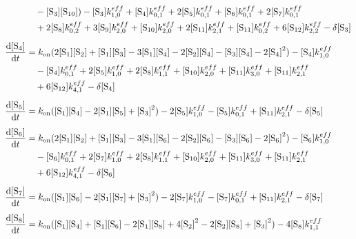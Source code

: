 \begin{align*}
 & \quad -\Conc{\species{3}}\Conc{\species{10}})-\Conc{\species{3}}k^{eff}_{1,0}+\Conc{\species{4}}k^{eff}_{0,1}+2\Conc{\species{5}}k^{eff}_{0,1}+\Conc{\species{6}}k^{eff}_{0,1}+2\Conc{\species{7}}k^{eff}_{0,1}\\
 & \quad +2\Conc{\species{8}}k^{eff}_{0,2}+3\Conc{\species{9}}k^{eff}_{2,0}+\Conc{\species{10}}k^{eff}_{2,0}+2\Conc{\species{11}}k^{eff}_{2,1}+\Conc{\species{11}}k^{eff}_{0,2}+6\Conc{\species{12}}k^{eff}_{2,2}-\delta\Conc{\species{3}}\\[0.5em]
\DCDtNoSpacing{\species{4}} &= \kon{}(2\Conc{\species{1}}\Conc{\species{2}}+\Conc{\species{1}}\Conc{\species{3}}-3\Conc{\species{1}}\Conc{\species{4}}-2\Conc{\species{2}}\Conc{\species{4}}-\Conc{\species{3}}\Conc{\species{4}}-2\Conc{\species{4}}^2)-\Conc{\species{4}}k^{eff}_{1,0}\\
 & \quad -\Conc{\species{4}}k^{eff}_{0,1}+2\Conc{\species{5}}k^{eff}_{1,0}+2\Conc{\species{8}}k^{eff}_{1,1}+\Conc{\species{10}}k^{eff}_{2,0}+\Conc{\species{11}}k^{eff}_{3,0}+\Conc{\species{11}}k^{eff}_{2,1}\\
 & \quad +6\Conc{\species{12}}k^{eff}_{4,1}-\delta\Conc{\species{4}}\\[0.5em]
\DCDtNoSpacing{\species{5}} &= \kon{}(\Conc{\species{1}}\Conc{\species{4}}-2\Conc{\species{1}}\Conc{\species{5}}+\Conc{\species{3}}^2)-2\Conc{\species{5}}k^{eff}_{1,0}-\Conc{\species{5}}k^{eff}_{0,1}+\Conc{\species{11}}k^{eff}_{2,1}-\delta\Conc{\species{5}}\\[0.5em]
\DCDtNoSpacing{\species{6}} &= \kon{}(2\Conc{\species{1}}\Conc{\species{2}}+\Conc{\species{1}}\Conc{\species{3}}-3\Conc{\species{1}}\Conc{\species{6}}-2\Conc{\species{2}}\Conc{\species{6}}-\Conc{\species{3}}\Conc{\species{6}}-2\Conc{\species{6}}^2)-\Conc{\species{6}}k^{eff}_{1,0}\\
 & \quad -\Conc{\species{6}}k^{eff}_{0,1}+2\Conc{\species{7}}k^{eff}_{1,0}+2\Conc{\species{8}}k^{eff}_{1,1}+\Conc{\species{10}}k^{eff}_{2,0}+\Conc{\species{11}}k^{eff}_{3,0}+\Conc{\species{11}}k^{eff}_{2,1}\\
 & \quad +6\Conc{\species{12}}k^{eff}_{4,1}-\delta\Conc{\species{6}}\\[0.5em]
\DCDtNoSpacing{\species{7}} &= \kon{}(\Conc{\species{1}}\Conc{\species{6}}-2\Conc{\species{1}}\Conc{\species{7}}+\Conc{\species{3}}^2)-2\Conc{\species{7}}k^{eff}_{1,0}-\Conc{\species{7}}k^{eff}_{0,1}+\Conc{\species{11}}k^{eff}_{2,1}-\delta\Conc{\species{7}}\\[0.5em]
\DCDtNoSpacing{\species{8}} &= \kon{}(\Conc{\species{1}}\Conc{\species{4}}+\Conc{\species{1}}\Conc{\species{6}}-2\Conc{\species{1}}\Conc{\species{8}}+4\Conc{\species{2}}^2-2\Conc{\species{2}}\Conc{\species{8}}+\Conc{\species{3}}^2)-4\Conc{\species{8}}k^{eff}_{1,1}\\

\end{align*}
